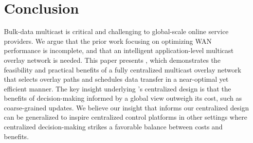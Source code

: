 \section{Conclusion}
Bulk-data multicast is critical and challenging to global-scale
online service providers.
We argue that the prior work focusing on optimizing WAN performance
is incomplete, and that an intelligent application-level multicast
overlay network is needed.
This paper presents \name, which demonstrates the feasibility
and practical benefits of a fully centralized multicast overlay
network that selects overlay paths and schedules data transfer in
a near-optimal yet efficient manner.
The key insight underlying \name's centralized design is that the
benefits of decision-making informed by a global view
outweigh its cost, such as coarse-grained updates.
We believe our insight that informs our centralized design can be
generalized to inspire centralized control platforms in other
settings where centralized decision-making strikes a favorable
balance between costs and benefits.
